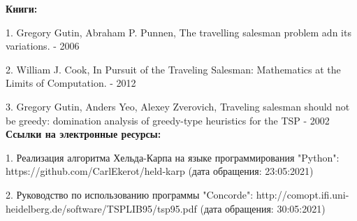 \documentclass[a4paper, 14pt]{extarticle}
\begin{document}
\textbf{Книги:}

1. Gregory Gutin, Abraham P. Punnen, The travelling salesman problem adn its variations. - 2006

2. William J. Cook, In Pursuit of the Traveling Salesman: Mathematics at the Limits of Computation. - 2012

3. Gregory Gutin, Anders Yeo, Alexey Zverovich, Traveling salesman should not be greedy: domination analysis of greedy-type heuristics for the TSP - 2002\\

\textbf{Ссылки на электронные ресурсы:}

1. Реализация алгоритма Хельда-Карпа на языке программирования "Python": https://github.com/CarlEkerot/held-karp (дата обращения: 23:05:2021)

2. Руководство по использованию программы "Concorde": http://comopt.ifi.uni-heidelberg.de/software/TSPLIB95/tsp95.pdf (дата обращения: 30:05:2021)
\end{document}
